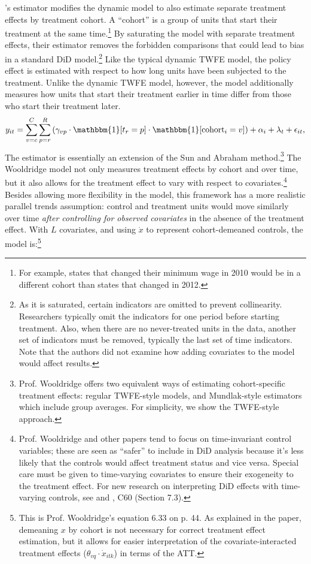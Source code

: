 \documentclass[12pt]{article}
\begin{document}
\citet{sunabr2021a}’s estimator modifies the dynamic model to also estimate separate treatment effects by treatment cohort. A “cohort” is a group of units that start their treatment at the same time.\footnote{For example, states that changed their minimum wage in 2010 would be in a different cohort than states that changed in 2012.}  By saturating the model with separate treatment effects, their estimator removes the forbidden comparisons that could lead to bias in a standard DiD model.\footnote{As it is saturated, certain indicators are omitted to prevent collinearity. Researchers typically omit the indicators for one period before starting treatment. Also, when there are no never-treated units in the data, another set of indicators must be removed, typically the last set of time indicators. Note that the authors did not examine how adding covariates to the model would affect results.}   Like the typical dynamic TWFE model, the policy effect is estimated with respect to how long units have been subjected to the treatment. Unlike the dynamic TWFE model, however, the \citet{sunabr2021a} model additionally measures how units that start their treatment earlier in time differ from those who start their treatment later.
\begin{equation}
    y_{it} = \sum_{v=c}^C\sum_{p=r}^R\left(\gamma_{vp}\cdot\mathbbm{1}[t_r=p]\cdot \mathbbm{1}[\text{cohort}_i=v]\right) + \alpha_i + \lambda_t + \epsilon_{it},
\end{equation}
The \citet{wooldridge2021two} estimator is essentially an extension of the Sun and Abraham method.\footnote{Prof. Wooldridge offers two equivalent ways of estimating cohort-specific treatment effects: regular TWFE-style models, and Mundlak-style estimators which include group averages. For simplicity, we show the TWFE-style approach.}  The Wooldridge model not only measures treatment effects by cohort and over time, but it also allows for the treatment effect to vary with respect to covariates.\footnote{Prof. Wooldridge and other papers tend to focus on time-invariant control variables; these are seen as “safer” to include in DiD analysis because it’s less likely that the controls would affect treatment status and vice versa. Special care must be given to time-varying covariates to ensure their exogeneity to the treatment effect. For new research on interpreting DiD effects with time-varying controls, see \citet{caetano2023} and \citet{wooldridge2023nonlinear}, C60 (Section 7.3).} Besides allowing more flexibility in the model, this framework has a more realistic parallel trends assumption: control and treatment units would move similarly over time \textit{after controlling for observed covariates} in the absence of the treatment effect. With $L$ covariates, and using $\dot{x}$ to represent cohort-demeaned controls, the model is:\footnote{This is Prof. Wooldridge’s equation 6.33 on p. 44. As explained in the paper, demeaning $x$ by cohort is not necessary for correct treatment effect estimation, but it allows for easier interpretation of the covariate-interacted treatment effects ($\theta_{vq}\cdot\dot{x}_{itk}$) in terms of the ATT.}
\end{document}
